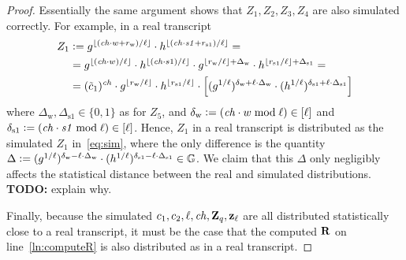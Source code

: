 \documentclass[11pt]{article}
\begin{document}
\begin{proof}
Essentially the same argument shows that $Z_1, Z_2, Z_3, Z_4$ are
also simulated correctly. 
For example, in a real transcript 
\begin{align*}
    Z_1 & \mathrel{\mathop:}= g^{\lfloor (\mathit{ch}\cdot w + r_\text{w}) / \ell \rfloor} \cdot 
             h^{\lfloor (\mathit{ch}\cdot \mathit{s1} + r_\text{s1}) / \ell \rfloor} = \\
       & =   g^{\lfloor (\mathit{ch}\cdot w) / \ell \rfloor} \cdot
             h^{\lfloor (\mathit{ch}\cdot s1) / \ell \rfloor} \cdot
             g^{\lfloor r_\text{w} / \ell \rfloor + \Delta_\text{w}} \cdot 
             h^{\lfloor r_\text{s1} / \ell \rfloor + \Delta_\text{s1}} =  \\
       & = (\tilde{c}_1)^\mathit{ch} \cdot
             g^{\lfloor r_\text{w} / \ell \rfloor} \cdot 
             h^{\lfloor r_\text{s1} / \ell \rfloor} \cdot 
             \left[ (g^{1/\ell})^{\delta_\text{w} + \ell \cdot \Delta_\text{w}} \cdot 
               (h^{1/\ell})^{\delta_\text{s1} + \ell \cdot \Delta_\text{s1}} \right]
\end{align*}
where $\Delta_\text{w}, \Delta_\text{s1} \in \{0,1\}$ as for $Z_5$, 
and $\delta_\text{w} \mathrel{\mathop:}= (\mathit{ch} \cdot w \bmod \ell) \in [{\ell}]$
and $\delta_\text{s1} \mathrel{\mathop:}= (\mathit{ch} \cdot \mathit{s1} \bmod \ell) \in [{\ell}]$.
Hence, $Z_1$ in a real transcript is distributed as 
the simulated $Z_1$ in~\eqref{eq:sim}, where the only
difference is the quantity 
$\Delta \mathrel{\mathop:}= (g^{1/\ell})^{\delta_\text{w} - \ell \cdot \Delta_\text{w}} \cdot 
               (h^{1/\ell})^{\delta_\text{s1} - \ell \cdot \Delta_\text{s1}} \in \mathbb G$. 
We claim that this $\Delta$ only negligibly affects the statistical distance
between the real and simulated distributions. 
{\bf TODO:} explain why.

Finally, because the simulated $c_1, c_2, \ell, \mathit{ch}, \mathbf{Z}_q, \mathbf{z}_\ell$
are all distributed statistically close to a real transcript, 
it must be the case that the computed $\mathbf{R}$ 
on line~\eqref{ln:computeR} is also distributed as in 
a real transcript. 
\end{proof}
\end{document}
